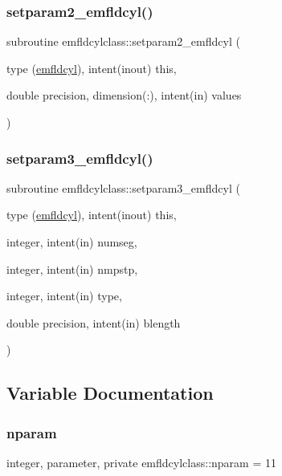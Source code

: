\subsubsection{\texorpdfstring{setparam2\_emfldcyl()}{setparam2\_emfldcyl()}}
{\footnotesize\ttfamily subroutine emfldcylclass\+::setparam2\+\_\+emfldcyl (\begin{DoxyParamCaption}\item[{type (\mbox{\hyperlink{namespaceemfldcylclass_structemfldcylclass_1_1emfldcyl}{emfldcyl}}), intent(inout)}]{this,  }\item[{double precision, dimension(\+:), intent(in)}]{values }\end{DoxyParamCaption})}

\mbox{\label{namespaceemfldcylclass_a9d9de556d5c18607ebed47a0615fdd44}} 
\subsubsection{\texorpdfstring{setparam3\_emfldcyl()}{setparam3\_emfldcyl()}}
{\footnotesize\ttfamily subroutine emfldcylclass\+::setparam3\+\_\+emfldcyl (\begin{DoxyParamCaption}\item[{type (\mbox{\hyperlink{namespaceemfldcylclass_structemfldcylclass_1_1emfldcyl}{emfldcyl}}), intent(inout)}]{this,  }\item[{integer, intent(in)}]{numseg,  }\item[{integer, intent(in)}]{nmpstp,  }\item[{integer, intent(in)}]{type,  }\item[{double precision, intent(in)}]{blength }\end{DoxyParamCaption})}



\subsection{Variable Documentation}
\mbox{\label{namespaceemfldcylclass_a4b336ecf0cd4052beb8ac386391e19e9}} 
\subsubsection{\texorpdfstring{nparam}{nparam}}
{\footnotesize\ttfamily integer, parameter, private emfldcylclass\+::nparam = 11\hspace{0.3cm}{\ttfamily [private]}}

